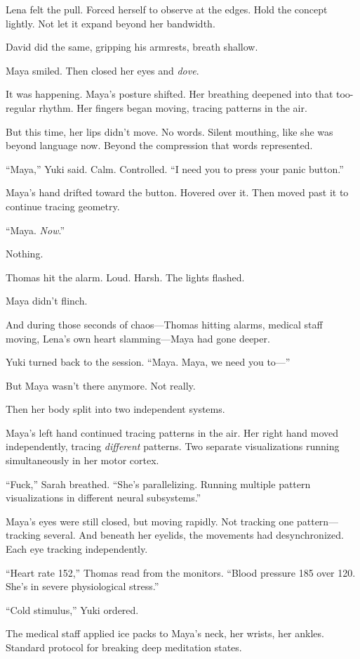 Lena felt the pull. Forced herself to observe at the edges. Hold the concept lightly. Not let it expand beyond her bandwidth.

David did the same, gripping his armrests, breath shallow.

Maya smiled. Then closed her eyes and \textit{dove}.

It was happening. Maya's posture shifted. Her breathing deepened into that too-regular rhythm. Her fingers began moving, tracing patterns in the air.

But this time, her lips didn't move. No words. Silent mouthing, like she was beyond language now. Beyond the compression that words represented.

``Maya,'' Yuki said. Calm. Controlled. ``I need you to press your panic button.''

Maya's hand drifted toward the button. Hovered over it. Then moved past it to continue tracing geometry.

``Maya. \textit{Now}.''

Nothing.

Thomas hit the alarm. Loud. Harsh. The lights flashed.

Maya didn't flinch.

And during those seconds of chaos—Thomas hitting alarms, medical staff moving, Lena's own heart slamming—Maya had gone deeper.

Yuki turned back to the session. ``Maya. Maya, we need you to—''

But Maya wasn't there anymore. Not really.

Then her body split into two independent systems.

Maya's left hand continued tracing patterns in the air. Her right hand moved independently, tracing \textit{different} patterns. Two separate visualizations running simultaneously in her motor cortex.

``Fuck,'' Sarah breathed. ``She's parallelizing. Running multiple pattern visualizations in different neural subsystems.''

Maya's eyes were still closed, but moving rapidly. Not tracking one pattern—tracking several. And beneath her eyelids, the movements had desynchronized. Each eye tracking independently.

``Heart rate 152,'' Thomas read from the monitors. ``Blood pressure 185 over 120. She's in severe physiological stress.''

``Cold stimulus,'' Yuki ordered.

The medical staff applied ice packs to Maya's neck, her wrists, her ankles. Standard protocol for breaking deep meditation states.

